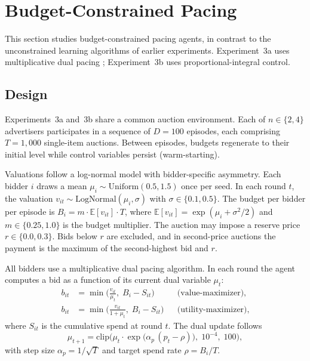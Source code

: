\section{Budget-Constrained Pacing}
\label{sec:pacing_results}
\label{sec:exp3_results}

This section studies budget-constrained pacing agents, in contrast to the unconstrained learning algorithms of earlier experiments. Experiment~3a uses multiplicative dual pacing \citep{Balseiro2019Learning}; Experiment~3b uses proportional-integral control.

\subsection{Design}
\label{sec:shared_env_pacing}
\label{sec:exp3_appendix}

Experiments~3a and~3b share a common auction environment. Each of $n \in \{2, 4\}$ advertisers participates in a sequence of $D = 100$ episodes, each comprising $T = 1{,}000$ single-item auctions. Between episodes, budgets regenerate to their initial level while control variables persist (warm-starting).

Valuations follow a log-normal model with bidder-specific asymmetry. Each bidder $i$ draws a mean $\mu_i \sim \mathrm{Uniform}(0.5, 1.5)$ once per seed. In each round $t$, the valuation $v_{it} \sim \mathrm{LogNormal}(\mu_i, \sigma)$ with $\sigma \in \{0.1, 0.5\}$. The budget per bidder per episode is $B_i = m \cdot \mathbb{E}[v_{it}] \cdot T$, where $\mathbb{E}[v_{it}] = \exp(\mu_i + \sigma^2/2)$ and $m \in \{0.25, 1.0\}$ is the budget multiplier. The auction may impose a reserve price $r \in \{0.0, 0.3\}$. Bids below $r$ are excluded, and in second-price auctions the payment is the maximum of the second-highest bid and $r$.

\label{sec:exp3a_design}
\label{sec:exp3a_appendix}

All bidders use a multiplicative dual pacing algorithm. In each round the agent computes a bid as a function of its current dual variable $\mu_t$:
\begin{align}
  b_{it} &= \min\!\Big(\frac{v_{it}}{\mu_t},\; B_i - S_{it}\Big) & &\text{(value-maximizer),} \label{eq:bid_vmax} \\
  b_{it} &= \min\!\Big(\frac{v_{it}}{1 + \mu_t},\; B_i - S_{it}\Big) & &\text{(utility-maximizer),} \label{eq:bid_umax}
\end{align}
where $S_{it}$ is the cumulative spend at round $t$. The dual update follows
\begin{equation}
  \mu_{t+1} = \mathrm{clip}\!\Big(\mu_t \cdot \exp\!\big(\alpha_p\,(p_t - \rho)\big),\; 10^{-4},\; 100\Big),
  \label{eq:dual_update_exp3a}
\end{equation}
with step size $\alpha_p = 1/\sqrt{T}$ and target spend rate $\rho = B_i / T$.

